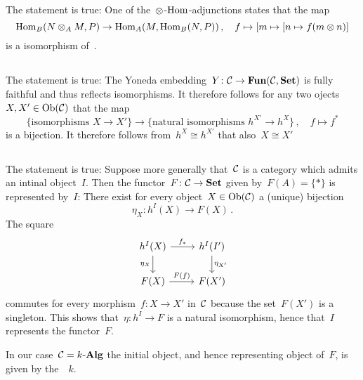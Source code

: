 \subsection{}

The statement is true:
One of the~$\otimes$\nobreakdash-$\operatorname{Hom}$\nobreakdash-adjunctions states that the map
\[
          \operatorname{Hom}_B(N \otimes_A M, P)
  \to     \operatorname{Hom}_A(M, \operatorname{Hom}_B(N, P)) \,,
  \quad   f
  \mapsto [m \mapsto [n \mapsto f(m \otimes n)]
\]
is a {\welldef} isomorphism of~{\kvs}.





\subsection{}

The statement is true:
The Yoneda embedding~$Y \colon \mathcal{C} \to \mathbf{Fun}(\mathcal{C}, \mathbf{Set})$ is fully faithful and thus reflects isomorphisms.
It therefore follows for any two ojects~$X, X' \in \operatorname{Ob}(\mathcal{C})$ that the map
\[
        \{\text{isomorphisms~$X \to X'$}\}
  \to   \{\text{natural isomorphisms~$h^{X'} \to h^X$}\} \,,
  \quad f
  \mapsto f^*
\]
is a {\welldef} bijection.
It therefore follows from~$h^X \cong h^{X'}$ that also~$X \cong X'$





\subsection{}

The statement is true:
Suppose more generally that~$\mathcal{C}$ is a category which admits an intinal object~$I$.
Then the functor~$F \colon \mathcal{C} \to \mathbf{Set}$ given by~$F(A) = \{\ast\}$ is represented by~$I$:
There exist for every object~$X \in \operatorname{Ob}(\mathcal{C})$ a (unique) bijection
\[
          \eta_X
  \colon  h^I(X)
  \to     F(X) \,.
\]
The square
\[
  \begin{tikzcd}
      h^I(X)
      \arrow{r}[above]{f_*}
      \arrow{d}[left]{\eta_X}
    & h^I(I')
      \arrow{d}[right]{\eta_{X'}}
    \\
      F(X)
      \arrow{r}[above]{F(f)}
    & F(X')
  \end{tikzcd}
\]
commutes for every morphism~$f \colon X \to X'$ in~$\mathcal{C}$ because the set~$F(X')$ is a singleton.
This shows that~$\eta \colon h^I \to F$ is a natural isomorphism, hence that~$I$ represents the functor~$F$.

In our case~$\mathcal{C} = \text{$k$-$\mathbf{Alg}$}$ the initial object, and hence representing object of~$F$, is given by the~{\kalg}~$k$.





